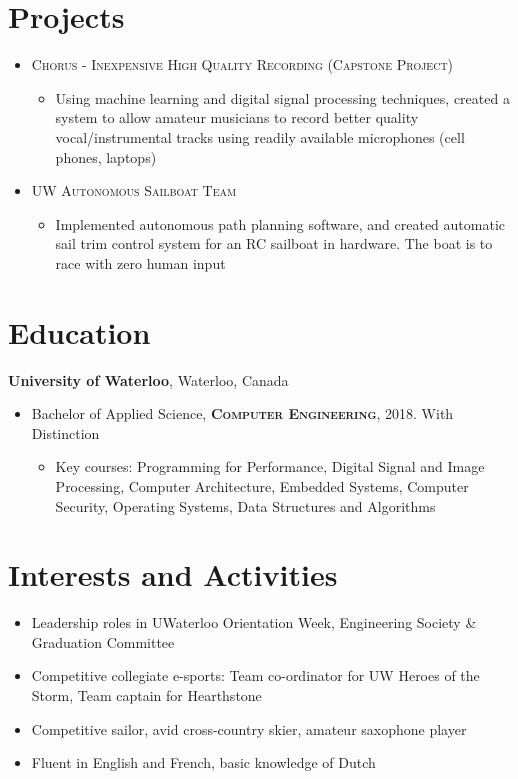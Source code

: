 \documentclass[a4paper,10pt]{article}
\begin{document}
\section{Projects}
\begin{itemize}
	\item {\textsc{Chorus - Inexpensive High Quality Recording (Capstone Project)}}
	\begin{itemize}
		\item {Using machine learning and digital signal processing techniques, created a system to allow amateur musicians to record better quality vocal/instrumental tracks using readily available microphones (cell phones, laptops)}
	\end{itemize}

	\item {\textsc{UW Autonomous Sailboat Team}}
	\begin{itemize}
		\item {Implemented autonomous path planning software, and created automatic sail trim control system for an RC sailboat in hardware. The boat is to race with zero human input}
	\end{itemize}
\end{itemize}

\section{Education}
\textbf{University of Waterloo}, Waterloo, Canada
\begin{itemize}
    \item{Bachelor of Applied Science, \textsc{\textbf{Computer Engineering}}, 2018. With Distinction}
    \begin{itemize}
        \item {\footnotesize{Key courses: Programming for Performance, Digital Signal and Image Processing, Computer Architecture, Embedded Systems, Computer Security, Operating Systems, Data Structures and Algorithms}}
    \end{itemize}
\end{itemize}

\section{Interests and Activities}
\begin{itemize}
	\item {Leadership roles in UWaterloo Orientation Week, Engineering Society \& Graduation Committee}
	\item {Competitive collegiate e-sports: Team co-ordinator for UW Heroes of the Storm, Team captain for Hearthstone}
	\item {Competitive sailor, avid cross-country skier, amateur saxophone player}
    \item {Fluent in English and French, basic knowledge of Dutch}
\end{itemize}
\end{document}
